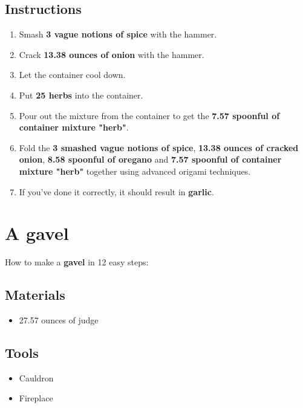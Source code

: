 \documentclass{article}
\begin{document}
\subsection{Instructions}\begin{enumerate}
\item 
Smash \textbf{3 vague notions of spice} with the hammer.
\item 
Crack \textbf{13.38 ounces of onion} with the hammer.
\item 
Let the container cool down.
\item 
Put \textbf{25 herbs} into the container.
\item 
Pour out the mixture from the container to get the \textbf{7.57 spoonful of container mixture "herb"}.
\item 
Fold the \textbf{3 smashed vague notions of spice}, \textbf{13.38 ounces of cracked onion}, \textbf{8.58 spoonful of oregano} and \textbf{7.57 spoonful of container mixture "herb"} together using advanced origami techniques.
\item 
If you've done it correctly, it should result in \textbf{garlic}.
\end{enumerate}
\newpage
\section{A gavel}How to make a \textbf{gavel} in 12 easy steps:

\subsection{Materials}\begin{itemize}
\item 
27.57 ounces of judge
\end{itemize}
\subsection{Tools}\begin{itemize}
\item 
Cauldron
\item 
Fireplace
\end{itemize}
\end{document}
